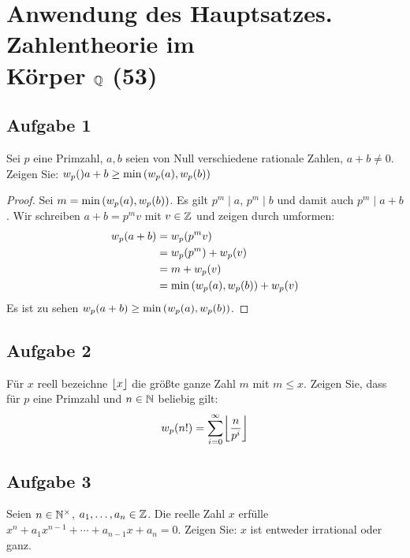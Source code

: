 \section[Anwendung des Hauptsatzes. Zahlentheorie im Körper \texorpdfstring{$\srational$}{Q} (53)]
 {Anwendung des Hauptsatzes. Zahlentheorie im\\
  Körper \texorpdfstring{$\srational$}{Q} (53)}

\subsection{Aufgabe 1}
Sei $p$ eine Primzahl, $a,b$ seien von Null verschiedene rationale Zahlen,
$a + b \neq 0$. Zeigen Sie: $w_p(){a + b} \geq
  \min{(w_p(a), w_p(b))}$
\begin{proof}
  Sei $m = \min{(w_p(a), w_p(b))}$. Es gilt $p^m \mid a$, $p^m \mid b$
  und damit auch $p^m \mid a + b$. Wir schreiben $a + b = p^{m}v$
  mit $v \in \mathbb{Z}$ und zeigen durch umformen:
  \begin{align*}
    w_p(a + b) & = w_p(p^{m}v)                                             \\
                           & = w_p(p^m) + w_p(v)                           \\
                           & = m + w_p(v)                                              \\
                           & = \min{(w_p(a), w_p(b))} + w_p(v)
  \end{align*}
  Es ist zu sehen $w_p(a + b) \geq \min{(w_p(a), w_p(b))}$.
\end{proof}

\subsection{Aufgabe 2}
Für $x$ reell bezeichne $\lfloor x\rfloor$ die größte ganze Zahl $m$ mit $m \leq x$.
Zeigen Sie, dass für $p$ eine Primzahl und $n \in \mathbb{N}$ beliebig gilt:
\begin{equation*}
  \primecountfunc{n!} = \sum_{i=0}^{\infty} \floor*{\frac{n}{p^i}}
\end{equation*}

\subsection{Aufgabe 3}
Seien $n \in \mathbb{N}^\times$, $a_1,\dotsc,a_n \in \mathbb{Z}$.
Die reelle Zahl $x$ erfülle $x^n + a_1x^{n-1} + \dotsb + a_{n - 1}x + a_n = 0$.
Zeigen Sie: $x$ ist entweder irrational oder ganz.

